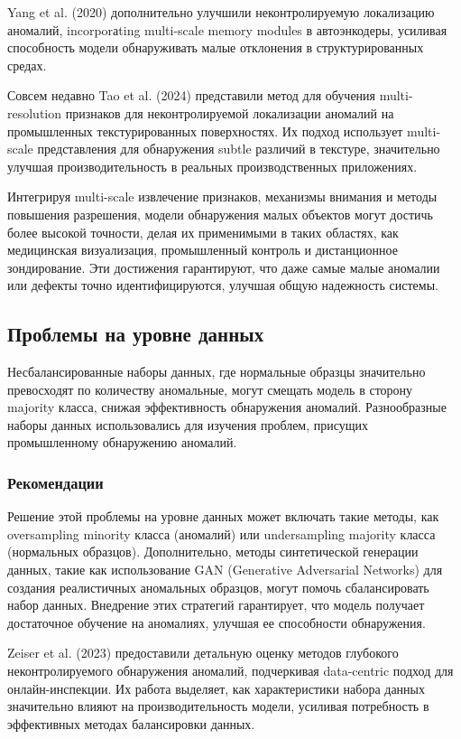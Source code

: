 \documentclass[14pt,a4paper]{article}
\begin{document}
Yang et al. (2020) дополнительно улучшили неконтролируемую локализацию аномалий, incorporаting multi-scale memory modules в автоэнкодеры, усиливая способность модели обнаруживать малые отклонения в структурированных средах.

Совсем недавно Tao et al. (2024) представили метод для обучения multi-resolution признаков для неконтролируемой локализации аномалий на промышленных текстурированных поверхностях. Их подход использует multi-scale представления для обнаружения subtle различий в текстуре, значительно улучшая производительность в реальных производственных приложениях.

Интегрируя multi-scale извлечение признаков, механизмы внимания и методы повышения разрешения, модели обнаружения малых объектов могут достичь более высокой точности, делая их применимыми в таких областях, как медицинская визуализация, промышленный контроль и дистанционное зондирование. Эти достижения гарантируют, что даже самые малые аномалии или дефекты точно идентифицируются, улучшая общую надежность системы.

\subsection{Проблемы на уровне данных}

Несбалансированные наборы данных, где нормальные образцы значительно превосходят по количеству аномальные, могут смещать модель в сторону majority класса, снижая эффективность обнаружения аномалий. Разнообразные наборы данных использовались для изучения проблем, присущих промышленному обнаружению аномалий.

\subsubsection{Рекомендации}
Решение этой проблемы на уровне данных может включать такие методы, как oversampling minority класса (аномалий) или undersampling majority класса (нормальных образцов). Дополнительно, методы синтетической генерации данных, такие как использование GAN (Generative Adversarial Networks) для создания реалистичных аномальных образцов, могут помочь сбалансировать набор данных. Внедрение этих стратегий гарантирует, что модель получает достаточное обучение на аномалиях, улучшая ее способности обнаружения.

Zeiser et al. (2023) предоставили детальную оценку методов глубокого неконтролируемого обнаружения аномалий, подчеркивая data-centric подход для онлайн-инспекции. Их работа выделяет, как характеристики набора данных значительно влияют на производительность модели, усиливая потребность в эффективных методах балансировки данных.
\end{document}
